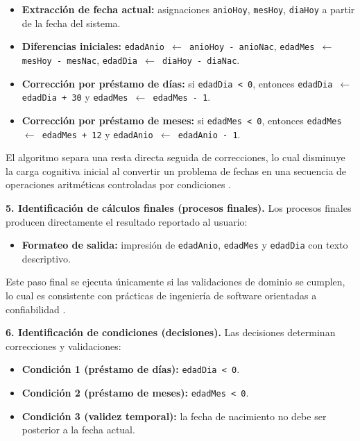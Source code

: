 \documentclass[12pt,twoside]{book}
\begin{document}
						\begin{itemize}
							\item \textbf{Extracción de fecha actual:} asignaciones \texttt{anioHoy}, \texttt{mesHoy}, \texttt{diaHoy} a partir de la fecha del sistema.
							\item \textbf{Diferencias iniciales:} \texttt{edadAnio $\leftarrow$ anioHoy - anioNac}, \texttt{edadMes $\leftarrow$ mesHoy - mesNac}, \texttt{edadDia $\leftarrow$ diaHoy - diaNac}.
							\item \textbf{Corrección por préstamo de días:} si \texttt{edadDia < 0}, entonces \texttt{edadDia $\leftarrow$ edadDia + 30} y \texttt{edadMes $\leftarrow$ edadMes - 1}.
							\item \textbf{Corrección por préstamo de meses:} si \texttt{edadMes < 0}, entonces \texttt{edadMes $\leftarrow$ edadMes + 12} y \texttt{edadAnio $\leftarrow$ edadAnio - 1}.
						\end{itemize}
						
						\noindent
						El algoritmo separa una resta directa seguida de correcciones, lo cual disminuye la carga cognitiva inicial al convertir un problema de fechas en una secuencia de operaciones aritméticas controladas por condiciones \cite{Lister2004Learning,Qian2018Students}.
						
						\noindent
						\textbf{5. Identificación de cálculos finales (procesos finales).}
						Los procesos finales producen directamente el resultado reportado al usuario:
						
						\begin{itemize}
							\item \textbf{Formateo de salida:} impresión de \texttt{edadAnio}, \texttt{edadMes} y \texttt{edadDia} con texto descriptivo.
						\end{itemize}
						
						\noindent
						Este paso final se ejecuta únicamente si las validaciones de dominio se cumplen, lo cual es consistente con prácticas de ingeniería de software orientadas a confiabilidad \cite{Pressman2019Software,Sommerville2015Software}.
						
						\noindent
						\textbf{6. Identificación de condiciones (decisiones).}
						Las decisiones determinan correcciones y validaciones:
						
						\begin{itemize}
							\item \textbf{Condición 1 (préstamo de días):} \texttt{edadDia < 0}.
							\item \textbf{Condición 2 (préstamo de meses):} \texttt{edadMes < 0}.
							\item \textbf{Condición 3 (validez temporal):} la fecha de nacimiento no debe ser posterior a la fecha actual.
						\end{itemize}
						
\end{document}

